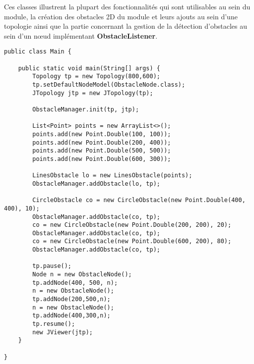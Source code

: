 \documentclass{article}
\begin{document}
Ces classes illustrent la plupart des fonctionnalités qui sont utilisables au sein du module, la création des obstacles 2D du module et leurs ajouts au sein d'une topologie ainsi que la partie concernant la gestion de la détection d'obstacles au sein d'un nœud implémentant \textbf{ObstacleListener}.\medskip

\begin{lstlisting}[frame=shadowbox,captionpos=b,caption={Classe Main},abovecaptionskip=2ex,label={main}]
public class Main {

    public static void main(String[] args) {
        Topology tp = new Topology(800,600);
        tp.setDefaultNodeModel(ObstacleNode.class);
        JTopology jtp = new JTopology(tp);

        ObstacleManager.init(tp, jtp);

        List<Point> points = new ArrayList<>();
        points.add(new Point.Double(100, 100));
        points.add(new Point.Double(200, 400));
        points.add(new Point.Double(500, 500));
        points.add(new Point.Double(600, 300));

        LinesObstacle lo = new LinesObstacle(points);
        ObstacleManager.addObstacle(lo, tp);

        CircleObstacle co = new CircleObstacle(new Point.Double(400, 400), 10);
        ObstacleManager.addObstacle(co, tp);
        co = new CircleObstacle(new Point.Double(200, 200), 20);
        ObstacleManager.addObstacle(co, tp);
        co = new CircleObstacle(new Point.Double(600, 200), 80);
        ObstacleManager.addObstacle(co, tp);

        tp.pause();
        Node n = new ObstacleNode();
        tp.addNode(400, 500, n);
        n = new ObstacleNode();
        tp.addNode(200,500,n);
        n = new ObstacleNode();
        tp.addNode(400,300,n);
        tp.resume();
        new JViewer(jtp);
    }

}
\end{lstlisting}
\end{document}
